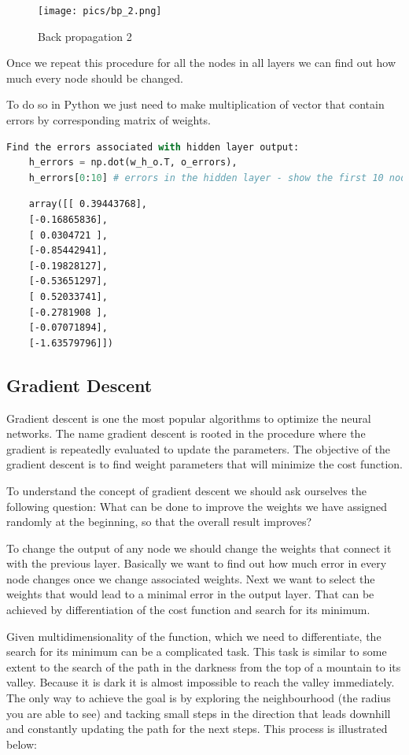 \begin{figure}[H]
    \texttt{[image: pics/bp\_2.png]}
    \caption{\label{fig:bp} Back propagation 2}
\end{figure}

Once we repeat this procedure for all the nodes in all layers we can find out how much every node should be changed.

To do so in Python we just need to make multiplication of vector that contain errors by corresponding matrix of weights.

\begin{lstlisting}[language=Python]
    Find the errors associated with hidden layer output:
    h_errors = np.dot(w_h_o.T, o_errors),
    h_errors[0:10] # errors in the hidden layer - show the first 10 nodes out of 90.
\end{lstlisting}

\begin{lstlisting}
    array([[ 0.39443768],
    [-0.16865836],
    [ 0.0304721 ],
    [-0.85442941],
    [-0.19828127],
    [-0.53651297],
    [ 0.52033741],
    [-0.2781908 ],
    [-0.07071894],
    [-1.63579796]])
\end{lstlisting}

\subsection{Gradient Descent}

Gradient descent is one the most popular algorithms to optimize the neural networks. The name gradient descent is rooted in the procedure where the gradient is repeatedly evaluated to update the parameters. The objective of the gradient descent is to find weight parameters that will minimize the cost function.

To understand the concept of gradient descent we should ask ourselves the following question: What can be done to improve the weights we have assigned randomly at the beginning, so that the overall result improves?

To change the output of any node we should change the weights that connect it with the previous layer. Basically we want to find out how much error in every node changes once we change associated weights. Next we want to select the weights that would lead to a minimal error in the output layer. That can be achieved by differentiation of the cost function and search for its minimum.

Given multidimensionality of the function, which we need to differentiate, the search for its minimum can be a complicated task. This task is similar to some extent to the search of the path in the darkness from the top of a mountain to its valley. Because it is dark it is almost impossible to reach the valley immediately. The only way to achieve the goal is by exploring the neighbourhood (the radius you are able to see) and tacking small steps in the direction that leads downhill and constantly updating the path for the next steps. This process is illustrated below:

